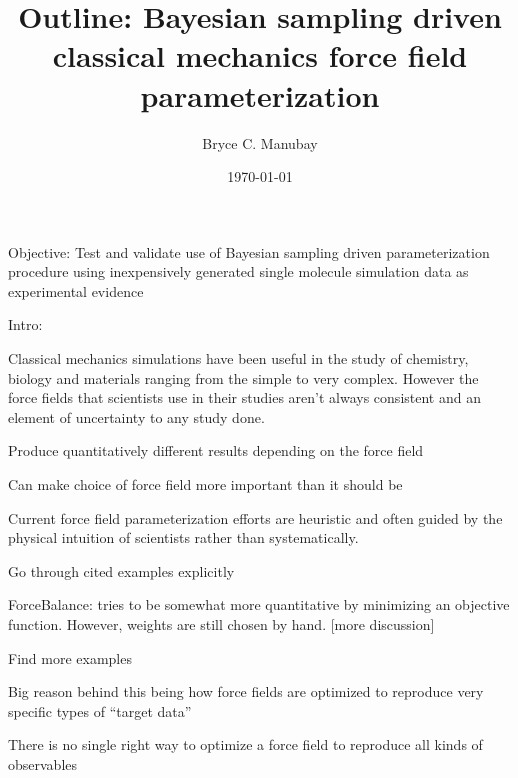 \documentclass{report}
\title{Outline: Bayesian sampling driven classical mechanics force field parameterization}
\author{Bryce C. Manubay}
\date{\today}
\begin{document}
{\let\newpage\relax\maketitle}
\begin{outline}
  \item{Objective: Test and validate use of Bayesian sampling driven parameterization procedure using inexpensively generated single molecule simulation data 
        as experimental evidence}
  \item{Intro:}
  \begin{outline}
    \item{Classical mechanics simulations have been useful in the study of chemistry, biology and materials ranging from the simple to very complex. However 
          the force fields that scientists use in their studies aren’t always consistent and an element of uncertainty to any study done.}
    \begin{outline}
      \item{Produce quantitatively different results depending on the force field \cite{ffcomp1,ffcomp2,ewen_comparison_2016,petrov_are_2014,
            guvench_comparison_2008}}            
      \item{Can make choice of force field more important than it should be}
    \end{outline}
    \item{Current force field parameterization efforts are heuristic and often guided by the physical intuition of scientists rather than systematically.
          \cite{parm94,tip3p,tip4pew,burger,law,combined,rational,aipar}
    \begin{outline}
      \item{Go through cited examples explicitly}
      \item{ForceBalance: tries to be somewhat more quantitative by minimizing an objective function.  However, weights are still chosen by hand. 
            [more discussion]\cite{FB1,FB2,FB3}}
      \item{Find more examples}
    \end{outline}
    \item{Big reason behind this being how force fields are optimized to reproduce very specific types of “target data”\cite{unchanged,monticelli}}
    \begin{outline}
      \item{There is no single right way to optimize a force field to reproduce all kinds of observables}
      \begin{outline}

\end{outline}
\end{outline}}
\end{outline}
\end{outline}
\end{document}
